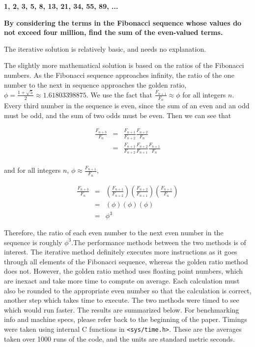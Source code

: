 \documentclass{article}
\begin{document}
\textbf{1, 2, 3, 5, 8, 13, 21, 34, 55, 89, ...}

\textbf{By considering the terms in the Fibonacci sequence whose values do not exceed four million, find the sum of the even-valued terms.}

\bigskip

The iterative solution is relatively basic, and needs no explanation.

The slightly more mathematical solution is based on the ratios of the Fibonacci numbers. As 
the Fibonacci sequence approaches infinity, the ratio of the one number to the next in 
sequence approaches the golden ratio, $\phi = \frac{1 + \sqrt{5}}{2} \approx 1.61803398875$. 
We use the fact that $\frac{F_{n+1}}{F_{n}} \approx \phi$ for all integers $n$.  Every third 
number in the sequence is even, since the sum of an even and an odd must be odd, and the sum 
of two odds must be even. Then we can see that

\begin{eqnarray*}
\frac{F_{n+3}}{F_{n}}	& = & \frac{F_{n+1}}{F_{n+2}}\frac{F_{n+2}}{F_{n}} \\
						& = & \frac{F_{n+1}}{F_{n+2}}\frac{F_{n+2}}{F_{n+1}}\frac{F_{n+1}}{F_{n}} \\
\end{eqnarray*}

and for all integers $n$, $\phi \approx \frac{F_{n+1}}{F_{n}}$, 

\begin{eqnarray*}
\frac{F_{n+3}}{F_{n}}	& = &\left(\frac{F_{n+1}}{F_{n+2}}\right)\left(\frac{F_{n+2}}{F_{n+1}}\right)\left(\frac{F_{n+1}}{F_{n}}\right) 	\\
						& = & (\phi)(\phi)(\phi)	\\
						& = & \phi^{3}
\end{eqnarray*}

Therefore, the ratio of each even number to the next even number in the sequence is roughly 
$\phi^{3}$.The performance methods between the two methods is of interest. The iterative 
method definitely executes more instructions as it goes through all elements of the Fibonacci 
sequence, whereas the golden ratio method does not. However, the golden ratio method uses 
floating point numbers, which are inexact and take more time to compute on average. Each 
calculation must also be rounded to the appropriate even number so that the calculation is 
correct, another step which takes time to execute. The two methods were timed to see which 
would run faster. The results are summarized below. For benchmarking info and machine specs, 
please refer back to the beginning of the paper. Timings were taken using internal C 
functions in \texttt{<sys/time.h>}. These are the averages taken over 1000 runs of the code, 
and the units are standard metric seconds. 
\end{document}
